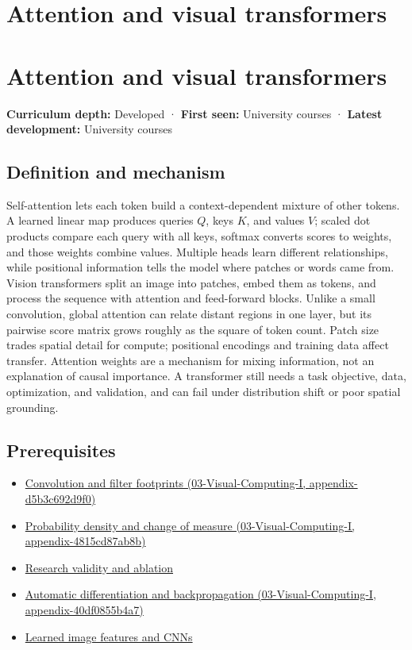 \hypertarget{appendix-a9d5dfdd164a}{}
\section*{Attention and visual transformers}
\section{Attention and visual transformers}\label{attention-and-visual-transformers}

\textbf{Curriculum depth:} Developed · \textbf{First seen:} University courses · \textbf{Latest development:} University courses

\subsection{Definition and mechanism}\label{definition-and-mechanism}

Self-attention lets each token build a context-dependent mixture of other tokens. A learned linear map produces queries \(Q\), keys \(K\), and values \(V\); scaled dot products compare each query with all keys, softmax converts scores to weights, and those weights combine values. Multiple heads learn different relationships, while positional information tells the model where patches or words came from. Vision transformers split an image into patches, embed them as tokens, and process the sequence with attention and feed-forward blocks. Unlike a small convolution, global attention can relate distant regions in one layer, but its pairwise score matrix grows roughly as the square of token count. Patch size trades spatial detail for compute; positional encodings and training data affect transfer. Attention weights are a mechanism for mixing information, not an explanation of causal importance. A transformer still needs a task objective, data, optimization, and validation, and can fail under distribution shift or poor spatial grounding.

\subsection{Prerequisites}\label{prerequisites}

\begin{itemize}
\tightlist
\item
  \href{}{Convolution and filter footprints (03-Visual-Computing-I, appendix-d5b3c692d9f0)}
\item
  \href{}{Probability density and change of measure (03-Visual-Computing-I, appendix-4815cd87ab8b)}
\item
  \hyperref[appendix-65788587ef78]{Research validity and ablation}
\item
  \href{}{Automatic differentiation and backpropagation (03-Visual-Computing-I, appendix-40df0855b4a7)}
\item
  \hyperref[appendix-47c51ea026fb]{Learned image features and CNNs}
\end{itemize}

